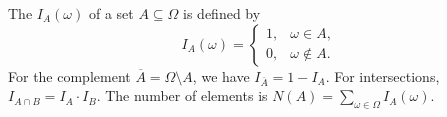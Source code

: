 The  $I_A(\omega)$ of a set $A \subseteq \Omega$ is defined by
$$I_A(\omega) = \begin{cases} 1, & \omega \in A, \\ 0, & \omega \notin A. \end{cases}$$
For the complement $\overline{A} = \Omega \setminus A$, we have $I_{\overline{A}} = 1 - I_A$. For intersections, $I_{A \cap B} = I_A \cdot I_B$. The number of elements is $N(A) = \sum_{\omega \in \Omega} I_A(\omega)$.
